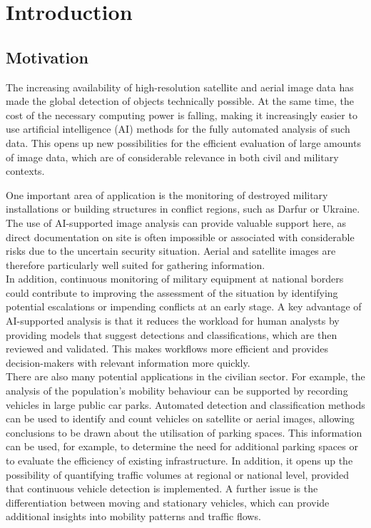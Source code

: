 \chapter{Introduction}
\label{ch:intro}
\section{Motivation}


The increasing availability of high-resolution satellite and aerial image data has made the global detection of objects technically possible. At the same time, the cost of the necessary computing power is falling, making it increasingly easier to use artificial intelligence (AI) methods for the fully automated analysis of such data. This opens up new possibilities for the efficient evaluation of large amounts of image data, which are of considerable relevance in both civil and military contexts.

One important area of application is the monitoring of destroyed military installations or building structures in conflict regions, such as Darfur \cite{Knoth2017} or Ukraine. The use of AI-supported image analysis can provide valuable support here, as direct documentation on site is often impossible or associated with considerable risks due to the uncertain security situation. Aerial and satellite images are therefore particularly well suited for gathering information. \\

In addition, continuous monitoring of military equipment at national borders could contribute to improving the assessment of the situation by identifying potential escalations or impending conflicts at an early stage. A key advantage of AI-supported analysis is that it reduces the workload for human analysts by providing models that suggest detections and classifications, which are then reviewed and validated. This makes workflows more efficient and provides decision-makers with relevant information more quickly. \\

There are also many potential applications in the civilian sector. For example, the analysis of the population's mobility behaviour can be supported by recording vehicles in large public car parks. Automated detection and classification methods can be used to identify and count vehicles on satellite or aerial images, allowing conclusions to be drawn about the utilisation of parking spaces. This information can be used, for example, to determine the need for additional parking spaces or to evaluate the efficiency of existing infrastructure. In addition, it opens up the possibility of quantifying traffic volumes at regional or national level, provided that continuous vehicle detection is implemented. A further issue is the differentiation between moving and stationary vehicles, which can provide additional insights into mobility patterns and traffic flows. \\

